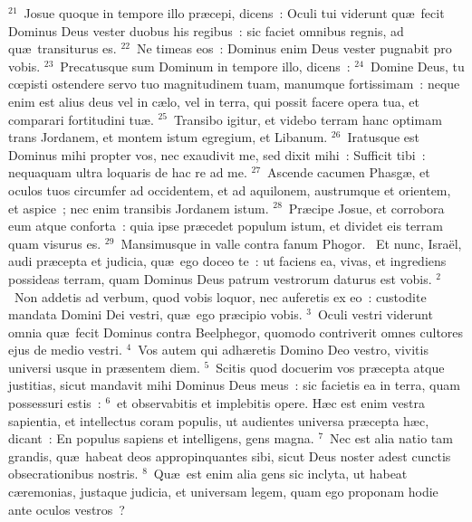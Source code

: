 ${}^{21}$~Josue quoque in tempore illo pr\ae cepi, dicens~: Oculi tui viderunt qu\ae\ fecit Dominus Deus vester duobus his regibus~: sic faciet omnibus regnis, ad qu\ae\ transiturus es.
${}^{22}$~Ne timeas eos~: Dominus enim Deus vester pugnabit pro vobis.
${}^{23}$~Precatusque sum Dominum in tempore illo, dicens~:
${}^{24}$~Domine Deus, tu cœpisti ostendere servo tuo magnitudinem tuam, manumque fortissimam~: neque enim est alius deus vel in c\ae lo, vel in terra, qui possit facere opera tua, et comparari fortitudini tu\ae .
${}^{25}$~Transibo igitur, et videbo terram hanc optimam trans Jordanem, et montem istum egregium, et Libanum.
${}^{26}$~Iratusque est Dominus mihi propter vos, nec exaudivit me, sed dixit mihi~: Sufficit tibi~: nequaquam ultra loquaris de hac re ad me.
${}^{27}$~Ascende cacumen Phasg\ae , et oculos tuos circumfer ad occidentem, et ad aquilonem, austrumque et orientem, et aspice~; nec enim transibis Jordanem istum.
${}^{28}$~Pr\ae cipe Josue, et corrobora eum atque conforta~: quia ipse pr\ae cedet populum istum, et dividet eis terram quam visurus es.
${}^{29}$~Mansimusque in valle contra fanum Phogor.
~Et nunc, Isra\"el, audi pr\ae cepta et judicia, qu\ae\ ego doceo te~: ut faciens ea, vivas, et ingrediens possideas terram, quam Dominus Deus patrum vestrorum daturus est vobis.
${}^{2}$~Non addetis ad verbum, quod vobis loquor, nec auferetis ex eo~: custodite mandata Domini Dei vestri, qu\ae\ ego pr\ae cipio vobis.
${}^{3}$~Oculi vestri viderunt omnia qu\ae\ fecit Dominus contra Beelphegor, quomodo contriverit omnes cultores ejus de medio vestri.
${}^{4}$~Vos autem qui adh\ae retis Domino Deo vestro, vivitis universi usque in pr\ae sentem diem.
${}^{5}$~Scitis quod docuerim vos pr\ae cepta atque justitias, sicut mandavit mihi Dominus Deus meus~: sic facietis ea in terra, quam possessuri estis~:
${}^{6}$~et observabitis et implebitis opere. H\ae c est enim vestra sapientia, et intellectus coram populis, ut audientes universa pr\ae cepta h\ae c, dicant~: En populus sapiens et intelligens, gens magna.
${}^{7}$~Nec est alia natio tam grandis, qu\ae\ habeat deos appropinquantes sibi, sicut Deus noster adest cunctis obsecrationibus nostris.
${}^{8}$~Qu\ae\ est enim alia gens sic inclyta, ut habeat c\ae remonias, justaque judicia, et universam legem, quam ego proponam hodie ante oculos vestros~?


